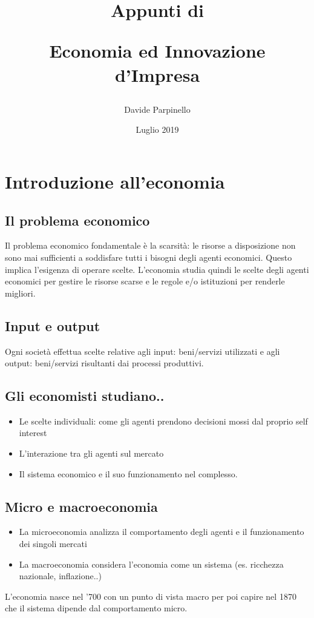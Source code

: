 \documentclass{report}
\begin{document}
	
	\author{Davide Parpinello}
	\title{%
			\begin{Large}
				Appunti di\\
			\end{Large}
		Economia ed Innovazione d'Impresa}
	\date{Luglio 2019}
	\maketitle
	
	\tableofcontents
	\renewcommand{\chaptermark}[1]{%
		\markboth{#1}{}}
	\pagestyle{fancy}
	\fancyhf{}
	\lhead{\leftmark}
	\rfoot{\thepage}
	
	\chapter{Introduzione all'economia}
	\section{Il problema economico}
	Il problema economico fondamentale è la scarsità: le risorse a disposizione non sono mai sufficienti a soddisfare tutti i bisogni degli agenti economici.
	Questo implica l'esigenza di operare scelte. L'economia studia quindi le scelte degli agenti economici per gestire le risorse scarse e le regole e/o istituzioni per renderle migliori.
	\section{Input e output}
	Ogni società effettua scelte relative agli input: beni/servizi utilizzati e agli output: beni/servizi risultanti dai processi produttivi.
	\section{Gli economisti studiano..}
	\begin{itemize}
		\item Le scelte individuali: come gli agenti prendono decisioni mossi dal proprio self interest
		\item L'interazione tra gli agenti sul mercato
		\item Il sistema economico e il suo funzionamento nel complesso.
	\end {itemize}
	\section{Micro e macroeconomia}
	\begin{itemize}
		\item La microeconomia analizza il comportamento degli agenti e il funzionamento dei singoli mercati
		\item La macroeconomia considera l'economia come un sistema (es. ricchezza nazionale, inflazione..)
	\end {itemize}
	L'economia nasce nel '700 con un punto di vista macro per poi capire nel 1870 che il sistema dipende dal comportamento micro.
\end{document}
